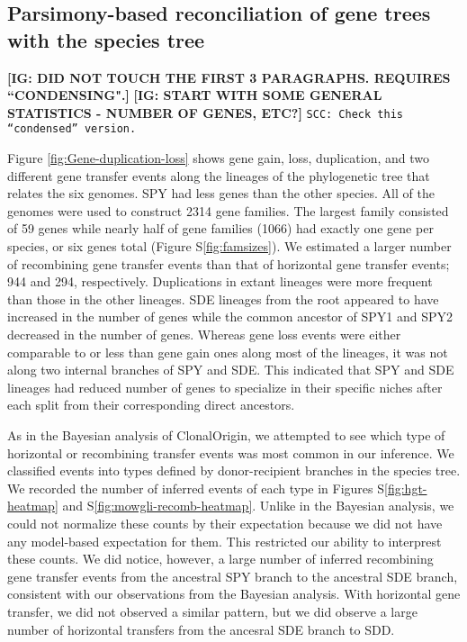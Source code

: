 \documentclass[10pt]{article}
\begin{document}
\subsection*{Parsimony-based reconciliation of gene trees with the species tree}

{\bf[IG: DID NOT TOUCH THE FIRST 3 PARAGRAPHS. REQUIRES ``CONDENSING".]}
{\bf[IG: START WITH SOME GENERAL STATISTICS - NUMBER OF GENES, ETC?]}
\texttt{SCC: Check this ``condensed'' version.}

Figure \ref{fig:Gene-duplication-loss} shows gene gain, loss, duplication, and
two different gene transfer events along the lineages of the phylogenetic tree
that relates the six genomes. SPY had less genes than the other species. All of
the genomes were used to construct 2314 gene families.  The largest family
consisted of 59 genes while nearly half of gene families (1066) had exactly one
gene per species, or six genes total (Figure S\ref{fig:famsizes}).  We estimated
a larger number of recombining gene transfer events than that of horizontal gene
transfer events; 944 and 294, respectively.  Duplications in extant lineages
were more frequent than those in the other lineages.  SDE lineages from the root
appeared to have increased in the number of genes while the common ancestor of
SPY1 and SPY2 decreased in the number of genes.  Whereas gene loss events were
either comparable to or less than gene gain ones along most of the lineages, it
was not along two internal branches of SPY and SDE.  This indicated that SPY and
SDE lineages had reduced number of genes to specialize in their specific niches
after each split from their corresponding direct ancestors.

As in the Bayesian analysis of ClonalOrigin, we attempted to see which type of
horizontal or recombining transfer events was most common in our inference.  We
classified events into types defined by donor-recipient branches in the species
tree. We recorded the number of inferred events of each type in Figures
S\ref{fig:hgt-heatmap} and S\ref{fig:mowgli-recomb-heatmap}. Unlike in the
Bayesian analysis, we could not normalize these counts by their expectation
because we did not have any model-based expectation for them. This restricted
our ability to interprest these counts. We did notice, however, a large number
of inferred recombining gene transfer events from the ancestral SPY branch to
the ancestral SDE branch, consistent with our observations from the Bayesian
analysis. With horizontal gene transfer, we did not observed a similar pattern,
but we did observe a large number of horizontal transfers from the ancesral SDE
branch to SDD. 
\end{document}
